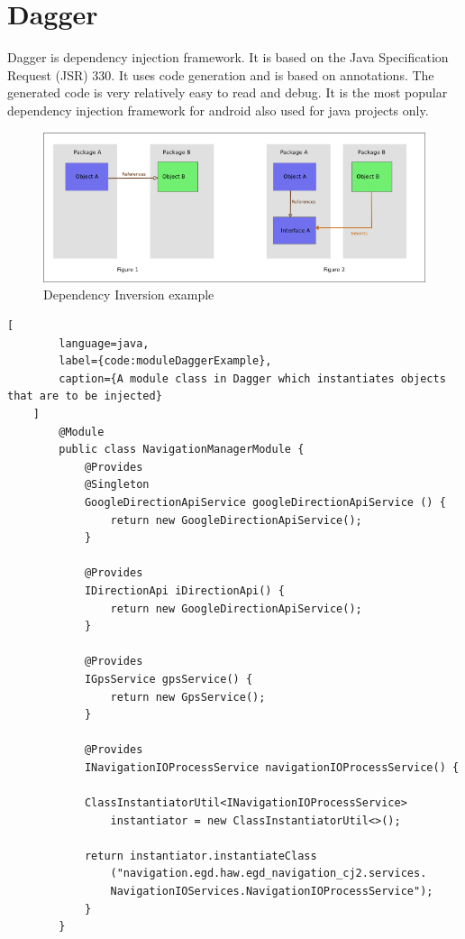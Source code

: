\newpage
    \section{Dagger}
        \label{appendix:dagger}
        Dagger is dependency injection framework. It is based on the 
        Java Specification Request (JSR) 330. 
        It uses code generation and is based 
        on annotations. The generated code is very relatively easy to read 
        and debug. It is the most popular dependency injection framework
        for android also used for java projects only.

        
    \begin{figure}[htbp!]
        \centering \includegraphics[scale=0.85]{grafiken/di.jpg}
        \caption{Dependency Inversion example \cite{AkhileshGoveeshSEECHURN}}
        \label{fig:DIExample}
    \end{figure}

    \newpage
    \begin{lstlisting}[
        language=java,
        label={code:moduleDaggerExample},
        caption={A module class in Dagger which instantiates objects that are to be injected}
    ]
        @Module
        public class NavigationManagerModule {
            @Provides
            @Singleton
            GoogleDirectionApiService googleDirectionApiService () {
                return new GoogleDirectionApiService();
            }

            @Provides
            IDirectionApi iDirectionApi() {
                return new GoogleDirectionApiService();
            }

            @Provides
            IGpsService gpsService() {
                return new GpsService();
            }

            @Provides
            INavigationIOProcessService navigationIOProcessService() {
                
            ClassInstantiatorUtil<INavigationIOProcessService> 
                instantiator = new ClassInstantiatorUtil<>();

            return instantiator.instantiateClass
                ("navigation.egd.haw.egd_navigation_cj2.services.
                NavigationIOServices.NavigationIOProcessService");
            }
        }
    \end{lstlisting}

